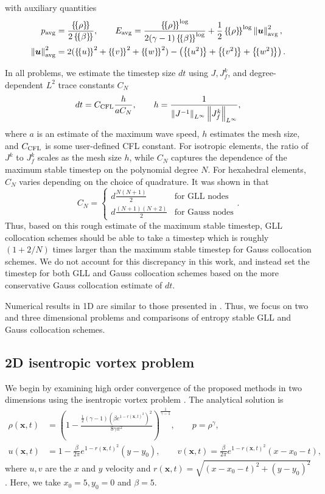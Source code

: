 \documentclass[onefignum,onetabnum,final]{siamart171218}
\newcommand{\nor}[1]{\left\| #1 \right\|}
\newcommand{\LRp}[1]{\left( #1 \right)}
\newcommand{\LRc}[1]{\left\{ #1 \right\}}
\newcommand{\avg}[1] {\ensuremath{\LRc{\!\{#1\}\!}}}
\begin{document}
with auxiliary quantities 
\begin{align*}
p_{\rm avg} &= \frac{\avg{\rho}}{2\avg{\beta}}, \qquad E_{\rm avg} = \frac{\avg{\rho}^{\log}}{2(\gamma-1)\avg{\beta}^{\log}} + \frac{1}{2}\avg{\rho}^{\log}\nor{\bm{u}}^2_{\rm avg}, \\
\nor{\bm{u}}^2_{\rm avg} &= 2(\avg{u}^2 + \avg{v}^2 + \avg{w}^2) - \LRp{\avg{u^2} +\avg{v^2} + \avg{w^2}}.\nonumber
\end{align*}

In all problems, we estimate the timestep size $dt$ using $J, J^k_f$, and degree-dependent $L^2$ trace constants $C_N$ 
\[
dt = C_{\rm CFL}\frac{ h}{ a C_N}, \qquad h = \frac{1}{{\nor{J^{-1}}_{L^{\infty}}}\nor{J^k_f}_{L^{\infty}}},
\]
where $a$ is an estimate of the maximum wave speed, $h$ estimates the mesh size, and $C_{\rm CFL}$ is some user-defined CFL constant.  For isotropic elements, the ratio of $J^k$ to $J^k_f$ scales as the mesh size $h$, while $C_N$ captures the dependence of the maximum stable timestep on the polynomial degree $N$.  For hexahedral elements, $C_N$ varies depending on the choice of quadrature.  It was shown in \cite{chan2015gpu} that 
\[
C_N =\begin{cases}
 d\frac{N(N+1)}{2} & \text{for GLL nodes}\\
d\frac{(N+1)(N+2)}{2} & \text{for Gauss nodes}
\end{cases}.
\]
Thus, based on this rough estimate of the maximum stable timestep, GLL collocation schemes should be able to take a timestep which is roughly $(1 + 2/N)$ times larger than the maximum stable timestep for Gauss collocation schemes.  We do not account for this discrepancy in this work, and instead set the timestep for both GLL and Gauss collocation schemes based on the more conservative Gauss collocation estimate of $dt$.  %

Numerical results in 1D are similar to those presented in \cite{chan2017discretely}.  Thus, we focus on two and three dimensional problems and comparisons of entropy stable GLL and Gauss collocation schemes.  

\subsection{2D isentropic vortex problem}

We begin by examining high order convergence of the proposed methods in two dimensions using the isentropic vortex problem \cite{shu1998essentially, crean2017high}.  The analytical solution is 
\begin{align}
\rho(\bm{x},t) &= \LRp{1 - \frac{\frac{1}{2}(\gamma-1)(\beta e^{1-r(\bm{x},t)^2})^2}{8\gamma \pi^2}}^{\frac{1}{\gamma-1}}, \qquad p = \rho^{\gamma},\\
u(\bm{x},t) &= 1 - \frac{\beta}{2\pi} e^{1-r(\bm{x},t)^2}(y-y_0), \qquad v(\bm{x},t) = \frac{\beta}{2\pi} e^{1-r(\bm{x},t)^2}(x-x_0-t),\nonumber
\end{align}
where $u, v$ are the $x$ and $y$ velocity and $r(\bm{x},t) = \sqrt{(x-x_0-t)^2 + (y-y_0)^2}$.  Here, we take $x_0 = 5, y_0 = 0$ and $\beta = 5$.  
\end{document}
